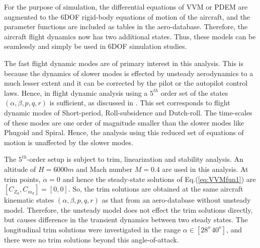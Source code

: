 \documentclass{AIAA}
\begin{document}
For the purpose of simulation, the differential equations of VVM or PDEM are augmented to the 6DOF rigid-body equations of motion of the aircraft, and the parameter functions are included as tables in the aero-database. Therefore, the aircraft flight dynamics now has two additional states. Thus, these models can be seamlessly and simply be used in 6DOF simulation studies.

The fast flight dynamic modes are of primary interest in this analysis. This is because the dynamics of slower modes is effected by unsteady aerodynamics to a much lesser extent and it can be corrected by the pilot or the autopilot control laws. Hence, in flight dynamic analysis using a $5^{th}$ order set of the states $(\alpha, \beta, p, q, r)$ is sufficient, as discussed in \cite{GomanAES1,GomanAES2}. This set corresponds to flight dynamic modes of Short-period, Roll-subsidence and Dutch-roll. The time-scales of these modes are one order of magnitude smaller than the slower modes like Phugoid and Spiral. Hence, the analysis using this reduced set of equations of motion is unaffected by the slower modes.

The $5^{th}$-order setup is subject to trim, linearization and stability analysis. An altitude of $H=6000 m$ and Mach number $M=0.4$ are used in this analysis. At trim points, $\dot{\alpha}=0$ and hence the steady-state solutions of Eq.(\ref{eq:VVMfun1}) are $[C_{Z_d},C_{m_d}]=[0,0]$. So, the trim solutions are obtained at the same aircraft kinematic states $(\alpha, \beta, p, q, r)$ as that from an aero-database without unsteady model. Therefore, the unsteady model does not effect the trim solutions directly, but causes difference in the transient dynamics between two steady states. The longitudinal trim solutions were investigated in the range $\alpha \in [28^o \, 40^o]$, and there were no trim solutions beyond this angle-of-attack.
%
\end{document}
